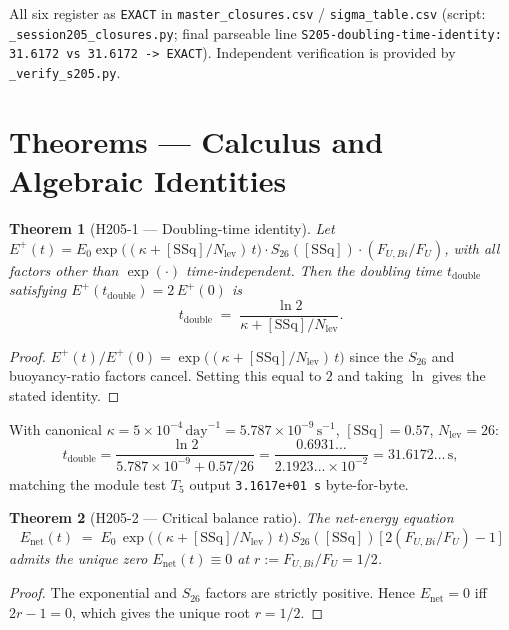 \documentclass[11pt,letterpaper]{article}
\newtheorem{theorem}{Theorem}
\theoremstyle{definition}
\begin{document}
All six register as \texttt{EXACT} in \texttt{master\_closures.csv} /
\texttt{sigma\_table.csv} (script: \texttt{\_session205\_closures.py}; final
parseable line \texttt{S205-doubling-time-identity: 31.6172 vs 31.6172 -> EXACT}).
Independent verification is provided by \texttt{\_verify\_s205.py}.

\section{Theorems --- Calculus and Algebraic Identities}

\begin{theorem}[H205-1 --- Doubling-time identity]
\label{thm:H205-1}
Let $E^{+}(t) = E_0 \exp\!\big((\kappa + [\mathrm{SSq}]/N_{\mathrm{lev}})\, t\big)
\cdot S_{26}([\mathrm{SSq}]) \cdot (F_{U,Bi}/F_U)$, with all factors other than
$\exp(\cdot)$ time-independent. Then the doubling time
$t_{\mathrm{double}}$ satisfying $E^{+}(t_{\mathrm{double}}) = 2\, E^{+}(0)$ is
\[
   t_{\mathrm{double}} \;=\; \frac{\ln 2}{\kappa + [\mathrm{SSq}]/N_{\mathrm{lev}}}.
\]
\end{theorem}
\begin{proof}
$E^{+}(t)/E^{+}(0) = \exp\!\big((\kappa + [\mathrm{SSq}]/N_{\mathrm{lev}})\, t\big)$
since the $S_{26}$ and buoyancy-ratio factors cancel. Setting this equal to $2$
and taking $\ln$ gives the stated identity.
\end{proof}

\noindent
With canonical $\kappa = 5 \times 10^{-4}\,\text{day}^{-1} = 5.787 \times 10^{-9}\,\text{s}^{-1}$,
$[\mathrm{SSq}]=0.57$, $N_{\mathrm{lev}}=26$:
\[
   t_{\mathrm{double}} = \frac{\ln 2}{5.787\times10^{-9} + 0.57/26}
   = \frac{0.6931\ldots}{2.1923\ldots \times 10^{-2}} = 31.6172\ldots\,\text{s},
\]
matching the module test $T_5$ output \texttt{3.1617e+01 s} byte-for-byte.

\begin{theorem}[H205-2 --- Critical balance ratio]
\label{thm:H205-2}
The net-energy equation
\[
   E_{\mathrm{net}}(t) \;=\; E_0\, \exp\!\big((\kappa + [\mathrm{SSq}]/N_{\mathrm{lev}})\, t\big)\, S_{26}([\mathrm{SSq}])\, \big[\, 2(F_{U,Bi}/F_U) - 1\, \big]
\]
admits the unique zero $E_{\mathrm{net}}(t)\equiv 0$ at $r := F_{U,Bi}/F_U = 1/2$.
\end{theorem}
\begin{proof}
The exponential and $S_{26}$ factors are strictly positive. Hence
$E_{\mathrm{net}}=0$ iff $2r - 1 = 0$, which gives the unique root $r=1/2$.
\end{proof}
\end{document}
